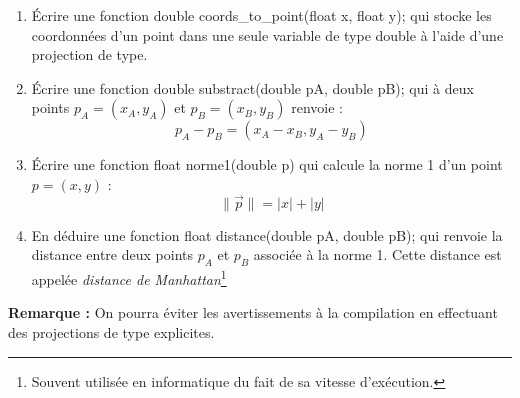 \documentclass[../../../main.tex]{subfiles}
\begin{document}
\begin{enumerate}
	\item Écrire une fonction \textsf{double coords\_to\_point(float x, float y);} qui stocke les coordonnées d'un point dans une seule variable de type \textsf{double} à l'aide d'une projection de type.
	\item Écrire une fonction \textsf{double substract(double pA, double pB);} qui à deux points $p_{A} = (x_{A}, y_{A})$ et $p_{B} = (x_{B}, y_{B})$ renvoie : $$p_{A} - p_{B} = (x_{A} - x_{B}, y_{A} - y_{B})$$
	\item Écrire une fonction \textsf{float norme1(double p)} qui calcule la norme 1 d'un point $p = (x, y)$ :
	$$\lVert{\vec{p}}\rVert = |x| + |y|$$
	\item En déduire une fonction \textsf{float distance(double pA, double pB);} qui renvoie la distance entre deux points $p_{A}$ et $p_{B}$ associée à la norme 1. Cette distance est appelée \textit{distance de Manhattan}\footnote{Souvent utilisée en informatique du fait de sa vitesse d'exécution.}
\end{enumerate}
\textbf{Remarque : }On pourra éviter les avertissements à la compilation en effectuant des projections de type explicites.
\end{document}

